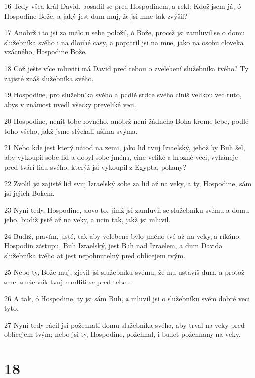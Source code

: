 \par 16 Tedy všed král David, posadil se pred Hospodinem, a rekl: Kdož jsem já, ó Hospodine Bože, a jaký jest dum muj, že jsi mne tak zvýšil?
\par 17 Anobrž i to jsi za málo u sebe položil, ó Bože, procež jsi zamluvil se o domu služebníka svého i na dlouhé casy, a popatril jsi na mne, jako na osobu cloveka vzácného, Hospodine Bože.
\par 18 Což ješte více mluviti má David pred tebou o zvelebení služebníka tvého? Ty zajisté znáš služebníka svého.
\par 19 Hospodine, pro služebníka svého a podlé srdce svého ciníš velikou vec tuto, abys v známost uvedl všecky preveliké veci.
\par 20 Hospodine, nenít tobe rovného, anobrž není žádného Boha krome tebe, podlé toho všeho, jakž jsme slýchali ušima svýma.
\par 21 Nebo kde jest který národ na zemi, jako lid tvuj Izraelský, jehož by Buh šel, aby vykoupil sobe lid a dobyl sobe jména, cine veliké a hrozné veci, vyháneje pred tvárí lidu svého, kterýž jsi vykoupil z Egypta, pohany?
\par 22 Zvolil jsi zajisté lid svuj Izraelský sobe za lid až na veky, a ty, Hospodine, sám jsi jejich Bohem.
\par 23 Nyní tedy, Hospodine, slovo to, jímž jsi zamluvil se služebníku svému a domu jeho, budiž jisté až na veky, a ucin tak, jakž jsi mluvil.
\par 24 Budiž, pravím, jisté, tak aby velebeno bylo jméno tvé až na veky, a ríkáno: Hospodin zástupu, Buh Izraelský, jest Buh nad Izraelem, a dum Davida služebníka tvého at jest nepohnutelný pred oblícejem tvým.
\par 25 Nebo ty, Bože muj, zjevil jsi služebníku svému, že mu ustavíš dum, a protož smel služebník tvuj modliti se pred tebou.
\par 26 A tak, ó Hospodine, ty jsi sám Buh, a mluvil jsi o služebníku svém dobré veci tyto.
\par 27 Nyní tedy rácil jsi požehnati domu služebníka svého, aby trval na veky pred oblícejem tvým; nebo jsi ty, Hospodine, požehnal, i budet požehnaný na veky.

\chapter{18}

